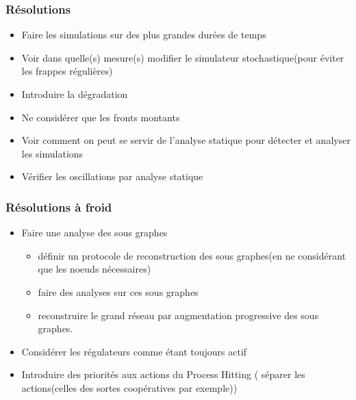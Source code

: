 
\begin{frame}[c]
  \frametitle{Résolutions}


\begin{itemize}
  \item Faire les simulations sur des plus grandes durées de temps
  \item Voir dans quelle(s) mesure(s) modifier le simulateur stochastique(pour éviter les frappes régulières)
  \item Introduire la dégradation
  \item Ne considérer que les fronts montants
  \item Voir comment on peut se servir de l'analyse statique pour détecter et analyser les simulations
  \item Vérifier les oscillations par analyse statique 
\end{itemize}


\end{frame}

\begin{frame}[c]
 \frametitle{Résolutions à froid}
 
 \begin{itemize}
  \item Faire une analyse des sous graphes
  \pause
   \begin{itemize}
    \item définir un protocole de reconstruction des sous graphes(en ne considérant que les noeuds nécessaires)
    \item faire des analyses sur ces sous graphes
    \item reconstruire le grand réseau par augmentation progressive des sous graphes.
   \end{itemize}

  \item Considérer les régulateurs comme étant toujours actif
  \item Introduire des priorités aux actions du Process Hitting
     ( séparer les actions(celles des sortes coopératives par exemple))
 \end{itemize}

\end{frame}
